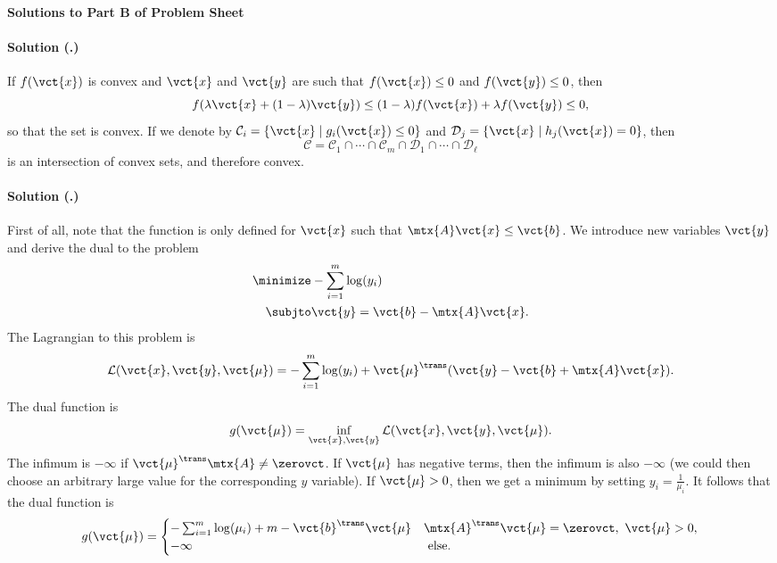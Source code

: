 \documentclass{article}
\newcounter{problemSheetNumber}
\newcounter{problems}
\renewcommand{\solution}[1]{\paragraph{Solution (\theproblemSheetNumber.\theproblems)}\addtocounter{problems}{1}\label{#1}}
\begin{document}
 
\begin{center}
{\Large {\bf Solutions to Part B of Problem Sheet \theproblemSheetNumber}}
\end{center}

\solution{pr:1} If $f(\vct{x})$ is convex and $\vct{x}$ and $\vct{y}$ are such that $f(\vct{x})\leq 0$ and $f(\vct{y})\leq 0$, then
\begin{equation*}
 f(\lambda \vct{x}+(1-\lambda)\vct{y})\leq (1-\lambda)f(\vct{x})+\lambda f(\vct{y}) \leq 0,
\end{equation*}
so that the set is convex. If we denote by $\mathcal{C}_i=\{\vct{x}\mid g_i(\vct{x})\leq 0\}$ and $\mathcal{D}_j=\{\vct{x}\mid h_j(\vct{x})=0\}$, then 
\begin{equation*}
 \mathcal{C}=\mathcal{C}_1\cap\cdots \cap \mathcal{C}_m\cap \mathcal{D}_1\cap\cdots \cap \mathcal{D}_\ell
\end{equation*}
is an intersection of convex sets, and therefore convex.

\solution{pr:2} First of all, note that the function is only defined for $\vct{x}$ such that $\mtx{A}\vct{x}\leq \vct{b}$. We introduce new variables $\vct{y}$ and derive the dual to the problem
\begin{align*}
 \minimize & -\sum_{i=1}^m \log(y_i)\\
 \subjto & \vct{y}=\vct{b}-\mtx{A}\vct{x}.
\end{align*}
The Lagrangian to this problem is
\begin{equation*}
 \mathcal{L}(\vct{x},\vct{y},\vct{\mu}) = -\sum_{i=1}^m \log(y_i)+\vct{\mu}^{\trans}(\vct{y}-\vct{b}+\mtx{A}\vct{x}).
\end{equation*}
The dual function is
\begin{equation*}
 g(\vct{\mu}) = \inf_{\vct{x},\vct{y}} \mathcal{L}(\vct{x},\vct{y},\vct{\mu}).
\end{equation*}
The infimum is $-\infty$ if $\vct{\mu}^{\trans}\mtx{A}\neq \zerovct$. If $\vct{\mu}$ has negative terms, then the infimum is also $-\infty$ (we could then choose an arbitrary large value for the corresponding $y$ variable). If $\vct{\mu}>0$, then we get a minimum by setting $y_i=\frac{1}{\mu_i}$. It follows that the dual function is
\begin{equation*}
 g(\vct{\mu}) = \begin{cases}
                   -\sum_{i=1}^m \log(\mu_i)+m-\vct{b}^{\trans}\vct{\mu} & \mtx{A}^{\trans}\vct{\mu}=\zerovct, \ \vct{\mu}>0,\\
                   -\infty & \text{ else.}
                \end{cases}
\end{equation*}
\end{document}
